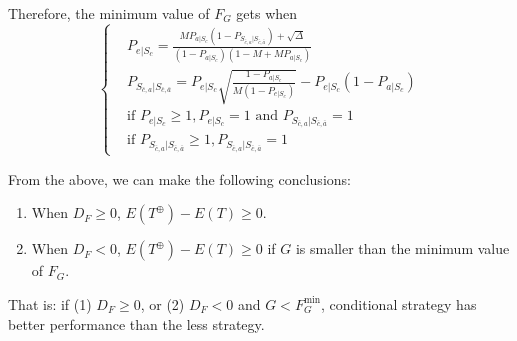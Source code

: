 Therefore, the minimum value of $F_G$ gets when
\begin{equation*}
\left\{
\begin{split}
&P_{e|S_{c}} = \frac{MP_{a|S_{c}}(1-P_{S_{\bar{c}, a}|S_{\bar{c},\bar{a}}})+\sqrt{\Delta}}{(1-P_{a|S_{c}})(1-M+MP_{a|S_{c}})} \\
&P_{S_{\bar{c}, a}|S_{\bar{c},\bar{a}}} = P_{e|S_{c}}\sqrt{\frac{1-P_{a|S_{c}}}{M(1-P_{e|S_{c}})}}-P_{e|S_{c}}(1-P_{a|S_{c}}) \\
& \text{if }P_{e|S_{c}} \geq 1, P_{e|S_{c}} = 1 \text{ and }P_{S_{\bar{c}, a}|S_{\bar{c},\bar{a}}} = 1\\
& \text{if }P_{S_{\bar{c}, a}|S_{\bar{c},\bar{a}}} \geq 1, P_{S_{\bar{c}, a}|S_{\bar{c},\bar{a}}} = 1
\end{split}
\right.
\end{equation*}

From the above, we can make the following conclusions:
\begin{enumerate}
  \item
  When $D_F \geq 0$, $E(T^{\oplus}) - E(T) \geq 0$.
  \item
  When $D_F < 0$, $E(T^{\oplus}) - E(T) \geq 0$ if $G$ is smaller than the minimum value of $F_G$.
\end{enumerate}

That is:
 if (1) $D_{F} \geq 0$, or (2) $D_{F} < 0$  and $G < F_G^{\min}$,
 conditional {\vwarm} strategy has better performance than the less {\vwarm} strategy.




